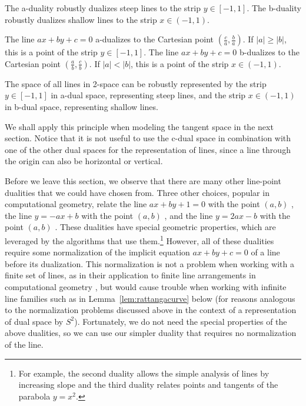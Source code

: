 \documentclass[12pt]{article}
\begin{document}
\begin{lemma}
\label{lem:steep}
The a-duality robustly dualizes steep lines to the strip $y \in [-1,1]$.
The b-duality robustly dualizes shallow lines to the strip $x \in (-1,1)$.
\end{lemma}
\prf
The line $ax+by+c=0$ a-dualizes to the Cartesian point $(\frac{c}{a}, \frac{b}{a})$.
If $|a| \geq |b|$, this is a point of the strip $y \in [-1,1]$.
The line $ax+by+c=0$ b-dualizes to the Cartesian point $(\frac{a}{b}, \frac{c}{b})$.
If $|a| < |b|$, this is a point of the strip $x \in (-1,1)$.
\QED

\vspace{-.2in}

\begin{corollary}
The space of all lines in 2-space can be robustly represented by
the strip $y \in [-1,1]$ in a-dual space, representing steep lines,
and the strip $x \in (-1,1)$ in b-dual space, representing shallow lines.
\end{corollary}

We shall apply this principle when modeling the tangent space in the 
next section.
Notice that it is not useful to use the c-dual space in combination
with one of the other dual spaces for the representation of lines, 
since a line through the origin can also be horizontal or vertical.

Before we leave this section, we observe that there are many other line-point dualities 
that we could have chosen from.
Three other choices, popular in computational geometry,
relate the line $ax+by+1=0$ with the point $(a,b)$ \cite{chazelle85}, %
the line $y = -ax + b$ with the point $(a,b)$ \cite{welzl85}, %
and the line $y=2ax-b$ with the point $(a,b)$ \cite{orourke94}.	%
These dualities have special geometric properties, 
which are leveraged by the algorithms that use them.\footnote{For example, 
	the second duality allows the simple analysis of lines by increasing slope
	and the third duality relates points and tangents of the parabola $y=x^2$.}
However, all of these dualities require some normalization of the
implicit equation $ax+by+c=0$ of a line before its dualization.
This normalization is not a problem when working with a finite set of lines,
as in their application to finite line arrangements in computational geometry
\cite{chazelle85,edels87,orourke94,welzl85},
but would cause trouble when working with infinite line families
such as in Lemma~\ref{lem:rattangacurve} below
(for reasons analogous to the normalization problems discussed above in the context
of a representation of dual space by $S^2$).
Fortunately, we do not need the special properties of the above dualities, 
so we can use our simpler duality that requires no normalization of the line.
\end{document}
